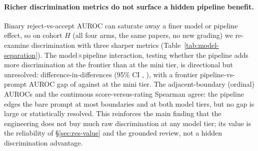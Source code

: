 \begin{table}[h]
  \centering
  \caption{\textbf{Balanced four-arm reliability follow-up} (Phase-3, post-review; a fresh
  cohort of \followupReliaN{} ICLR-2026 papers, ten per decision tier, disjoint from cohorts
  $M$ and $H$, each graded \followupReliaRuns{} times under all four arms). Median within-paper
  SD of the overall score by decision tier and model tier. AIPR grades far more consistently
  than the one-paragraph Direct baseline at both model tiers, and the gap is largest on
  rejects. The frontier tier is significant at exact Wilcoxon \followupFrontReliaPrel{} and the
  mini tier at \followupMiniReliaPrel{} ($n=\followupReliaN$). Reported alongside the
  pre-registered $n=10$ variance sub-study (Fig.~\ref{fig:run-variance}), which it confirms.}
  \label{tab:followup-reliability}
  
\end{table}

\paragraph{Richer discrimination metrics do not surface a hidden pipeline benefit.}
Binary reject-vs-accept AUROC can saturate away a finer model or pipeline effect, so on
cohort $H$ (all four arms, the same \interactionN{} papers, no new grading) we re-examine
discrimination with three sharper metrics (Table~\ref{tab:model-separation}). The
model$\times$pipeline interaction, testing whether the pipeline adds more discrimination at
the frontier than at the mini tier, is directional but unresolved: difference-in-differences
\interactionDiD{} (95\% CI \interactionDiDCI, \interactionDiDPrel), with a frontier
pipeline-vs-prompt AUROC gap of \gapFrontierAUROC{} against \gapMiniAUROC{} at the mini tier.
The adjacent-boundary (ordinal) AUROCs and the continuous score-versus-rating Spearman agree:
the pipeline edges the bare prompt at most boundaries and at both model tiers, but no gap is
large or statistically resolved. This reinforces the main finding that the engineering does
not buy much raw discrimination at any model tier; its value is the reliability of
\S\ref{sec:res-value} and the grounded review, not a hidden discrimination advantage.

\begin{table}[h]
  \centering
  \caption{\textbf{Model-separating re-analyses} (cohort $H$, all four arms, the same
  \interactionN{} papers; post-review, exploratory). Adjacent-boundary (ordinal) AUROCs at
  the reject$|$poster and poster$|$oral boundaries, and the continuous Spearman correlation
  between the grader's overall score and the mean reviewer rating. AIPR edges the
  one-paragraph Direct baseline at most boundaries and at both model tiers, but no gap is
  large; the model$\times$pipeline interaction is directional yet unresolved
  (difference-in-differences \interactionDiD{}, 95\% CI \interactionDiDCI,
  \interactionDiDPrel).}
  \label{tab:model-separation}
  
\end{table}

